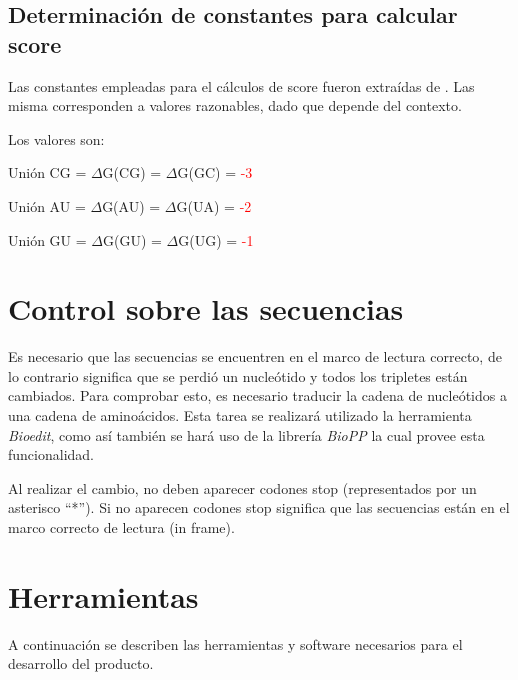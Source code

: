 \documentclass[12pt,a4paper,spanish]{article}
\begin{document}
	\subsection{Determinación de constantes para calcular score}
		\label{zuker}
		\par Las constantes empleadas para el cálculos de score fueron extraídas de \cite{7}. Las misma corresponden a 			valores razonables, dado que depende del contexto.
		\par Los valores son: 
			\par \hspace{2.8cm} Unión CG = $\Delta$G(CG) = $\Delta$G(GC) = \textcolor{red}{-3}
			\par \hspace{2.8cm} Unión AU = $\Delta$G(AU) = $\Delta$G(UA) = \textcolor{red}{-2}
			\par \hspace{2.8cm} Unión GU = $\Delta$G(GU) = $\Delta$G(UG) = \textcolor{red}{-1}

\section{Control sobre las secuencias}	
	\par Es necesario que las secuencias se encuentren en el marco de lectura correcto, de lo contrario significa que se 		perdió un nucleótido y todos los tripletes están cambiados. Para comprobar esto, es necesario traducir la cadena de 	nucleótidos a una cadena de aminoácidos. Esta tarea se realizará utilizado la herramienta \textit{Bioedit}, como así 		también se hará uso de la librería \textit{BioPP} la cual provee esta funcionalidad.	
	\par Al realizar el cambio, no deben aparecer codones stop (representados por un asterisco ``*''). Si no aparecen 		codones stop significa que las secuencias están en el marco correcto de lectura (in frame).
	
\section{Herramientas} 
	A continuación se describen las herramientas y software necesarios para el desarrollo del producto.
\end{document}
